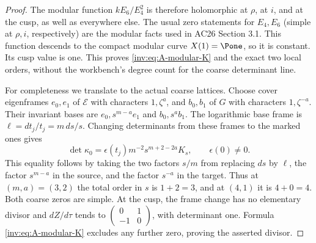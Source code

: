 \begin{proof}
The modular function $k E_6/E_4^2$ is therefore holomorphic at
$\rho$, at $i$, and at the cusp, as well as everywhere else.
The usual zero statements for $E_4,E_6$ (simple at $\rho,i$,
respectively) are the modular facts used in AC26 Section 3.1.
This function descends to the compact modular curve $X(1)=\Pone$,
so it is constant.  Its cusp value is one.  This proves
\eqref{inv:eq:A-modular-K} and the exact two local orders, without the
workbench's degree count for the coarse determinant line.

For completeness we translate to the actual coarse lattices.  Choose
cover eigenframes $e_0,e_1$ of $\mathcal E$ with characters
$1,\zeta^a$, and $b_0,b_1$ of $G$ with characters
$1,\zeta^{-a}$.  Their invariant bases are
$e_0,s^{m-a}e_1$ and $b_0,s^ab_1$.  The logarithmic base frame is
$\ell=dt_j/t_j=m\,ds/s$.  Changing determinants from these frames
to the marked ones gives
\[
\det\kappa_0=\epsilon(t_j)m^{-2}s^{m+2-2a}K_s,
\qquad \epsilon(0)\ne0.
\]
This equality follows by taking the two factors $s/m$ from replacing
$ds$ by $\ell$, the factor $s^{m-a}$ in the source, and the factor
$s^{-a}$ in the target.  Thus at $(m,a)=(3,2)$ the total order in
$s$ is $1+2=3$, and at $(4,1)$ it is $4+0=4$.
Both coarse zeros are simple.  At the cusp, the frame change has
no elementary divisor and $dZ/d\tau$ tends to
$\left(\begin{smallmatrix}0&1\\-1&0\end{smallmatrix}\right)$,
with determinant one.  Formula \eqref{inv:eq:A-modular-K} excludes any
further zero, proving the asserted divisor.
\end{proof}

